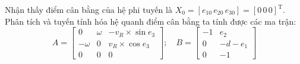           \hspace{0.6cm}Nhận thấy điểm cân bằng của hệ phi tuyến là $X_0 = [e_{10} \, e_{20} \, e_{30}] = [0 \, 0 \, 0]^{\text{T}}$. Phân tích và tuyến tính hóa hệ quanh điểm cân bằng ta tính được các ma trận:
          \begin{equation*}
               A = \begin{bmatrix}
               0 & \omega & -v_R \times \sin e_3 \\
               -\omega & 0 & v_R \times \cos e_3 \\
               0 & 0 & 0
               \end{bmatrix}; \quad B = \begin{bmatrix}
               -1 & e_2 \\
               0 & -d - e_1 \\
               0 & -1
               \end{bmatrix}
          \end{equation*}
